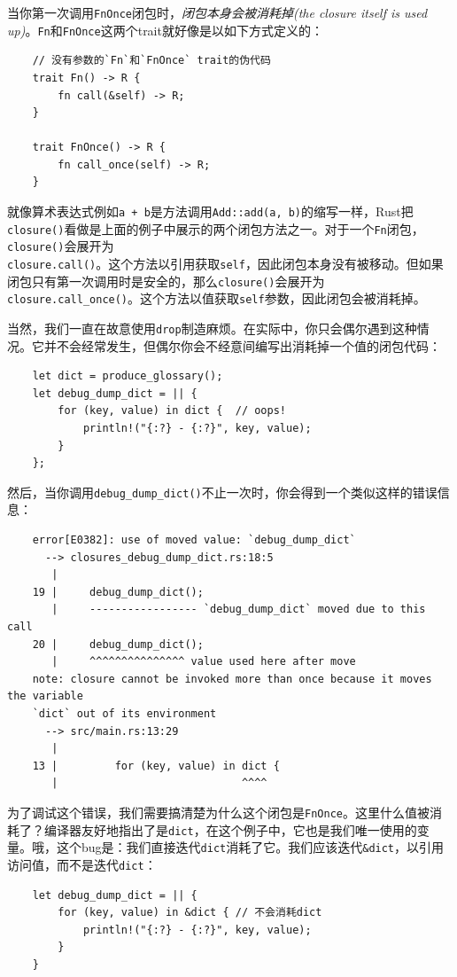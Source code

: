 当你第一次调用\texttt{FnOnce}闭包时，\emph{闭包本身会被消耗掉(the closure itself is used up)}。\texttt{Fn}和\texttt{FnOnce}这两个trait就好像是以如下方式定义的：
\begin{verbatim}
    // 没有参数的`Fn`和`FnOnce` trait的伪代码
    trait Fn() -> R {
        fn call(&self) -> R;
    }

    trait FnOnce() -> R {
        fn call_once(self) -> R;
    }
\end{verbatim}

就像算术表达式例如\texttt{a + b}是方法调用\texttt{Add::add(a, b)}的缩写一样，Rust把\texttt{closure()}看做是上面的例子中展示的两个闭包方法之一。对于一个\texttt{Fn}闭包，\texttt{closure()}会展开为\\
\texttt{closure.call()}。这个方法以引用获取\texttt{self}，因此闭包本身没有被移动。但如果闭包只有第一次调用时是安全的，那么\texttt{closure()}会展开为\texttt{closure.call\_once()}。这个方法以值获取\texttt{self}参数，因此闭包会被消耗掉。

当然，我们一直在故意使用\texttt{drop}制造麻烦。在实际中，你只会偶尔遇到这种情况。它并不会经常发生，但偶尔你会不经意间编写出消耗掉一个值的闭包代码：
\begin{verbatim}
    let dict = produce_glossary();
    let debug_dump_dict = || {
        for (key, value) in dict {  // oops!
            println!("{:?} - {:?}", key, value);
        }
    };
\end{verbatim}

然后，当你调用\texttt{debug\_dump\_dict()}不止一次时，你会得到一个类似这样的错误信息：
\begin{verbatim}
    error[E0382]: use of moved value: `debug_dump_dict`
      --> closures_debug_dump_dict.rs:18:5
       |
    19 |     debug_dump_dict();
       |     ----------------- `debug_dump_dict` moved due to this call
    20 |     debug_dump_dict();
       |     ^^^^^^^^^^^^^^^ value used here after move
    note: closure cannot be invoked more than once because it moves the variable
    `dict` out of its environment
      --> src/main.rs:13:29
       |
    13 |         for (key, value) in dict {
       |                             ^^^^
\end{verbatim}

为了调试这个错误，我们需要搞清楚为什么这个闭包是\texttt{FnOnce}。这里什么值被消耗了？编译器友好地指出了是\texttt{dict}，在这个例子中，它也是我们唯一使用的变量。哦，这个bug是：我们直接迭代\texttt{dict}消耗了它。我们应该迭代\texttt{\&dict}，以引用访问值，而不是迭代\texttt{dict}：
\begin{verbatim}
    let debug_dump_dict = || {
        for (key, value) in &dict { // 不会消耗dict
            println!("{:?} - {:?}", key, value);
        }
    }
\end{verbatim}

